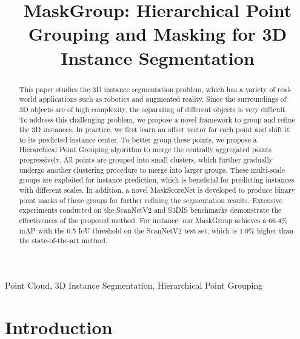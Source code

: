\documentclass{article}
\begin{document}
\sloppy

\def\x{{\mathbf x}}
\def\L{{\cal L}}


\title{MaskGroup: Hierarchical Point Grouping and Masking for 3D Instance Segmentation}
 \address{ Key Laboratory on Machine Perception, Peking University\\
	 Huawei Noah's Ark Lab\\
	\small\{xinghao.chen, yunhe.wang\}@huawei.com, \{minzhong, zeng\}@pku.edu.cn
}


\maketitle


\begin{abstract}
This paper studies the 3D instance segmentation problem, which has a variety of real-world applications such as robotics and augmented reality. Since the surroundings of 3D objects are of high complexity, the separating of different objects is very difficult. To address this challenging problem, we propose a novel framework to group and refine the 3D instances. In practice, we first learn an offset vector for each point and shift it to its predicted instance center. To better group these points, we propose a Hierarchical Point Grouping algorithm to merge the centrally aggregated points progressively. All points are grouped into small clusters, which further gradually undergo another clustering procedure to merge into larger groups. These multi-scale groups are exploited for instance prediction, which is beneficial for predicting instances with different scales. In addition, a novel MaskScoreNet is developed to produce binary point masks of these groups for further refining the segmentation results. Extensive experiments conducted on the ScanNetV2 and S3DIS benchmarks demonstrate the effectiveness of the proposed method. For instance, our MaskGroup achieves a 66.4\% mAP with the 0.5 IoU threshold on the ScanNetV2 test set, which is 1.9\% higher than the state-of-the-art method.
\end{abstract}
\begin{keywords}
Point Cloud, 3D Instance Segmentation, Hierarchical Point Grouping
\end{keywords}

\section{Introduction}
\end{document}
